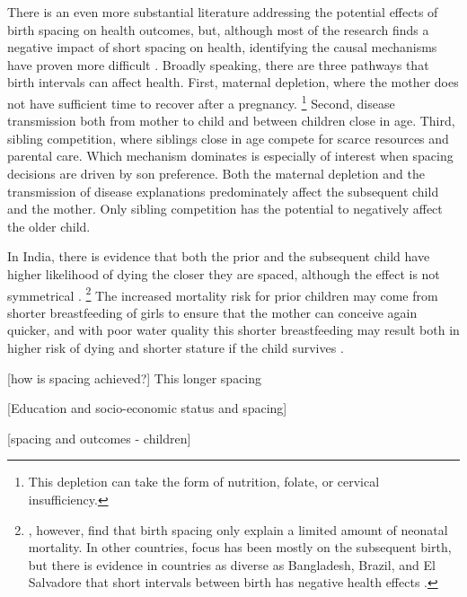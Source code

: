 There is an even more substantial literature addressing the potential effects of birth 
spacing on health outcomes, but, although most of the research finds a negative impact of 
short spacing on health, identifying the causal mechanisms have proven more difficult
\citep{Conde-Agudelo2006,Conde-Agudelo2012}.
Broadly speaking, there are three pathways that birth intervals can affect health.
First, maternal depletion, where the mother does not have sufficient
time to recover after a pregnancy.%
\footnote{
This depletion can take the form of nutrition, folate, or cervical insufficiency.
}
Second, disease transmission both from mother to child and between children close in age.
Third, sibling competition, where siblings close in age compete for scarce resources and
parental care.
Which mechanism dominates is especially of interest when spacing decisions are driven by 
son preference.
Both the maternal depletion and the transmission of disease explanations predominately
affect the subsequent child and the mother.
Only sibling competition has the potential to negatively affect the older child.

In India, there is evidence that both the prior and the subsequent child have higher
likelihood of dying the closer they are spaced, although the effect is not symmetrical
\citep{Whitworth2002,Bhargava2003,Maitra2008,Makepeace2008}.%
\footnote{
\cite{Bhalotra2008}, however, find that birth spacing only explain a limited amount
of neonatal mortality.
In other countries, focus has been mostly on the subsequent birth, but there is evidence 
in countries as diverse as Bangladesh, Brazil, and El Salvadore that
short intervals between birth has negative health effects
\citep{Curtis1993,Davanzo2008,Gribble2009,Saha2013}.
}
The increased mortality risk for prior children may come from shorter breastfeeding of 
girls to ensure that the mother can conceive again quicker, and with poor water
quality this shorter breastfeeding may result both in higher risk of dying and shorter
stature if the child survives \citep{Jayachandran2011,Jayachandran2017a}.





[how is spacing achieved?]
This longer spacing 
\citep{Rahman1993}
\citep{Jayachandran2011}


[Education and socio-economic status and spacing]





[spacing and outcomes - children]


